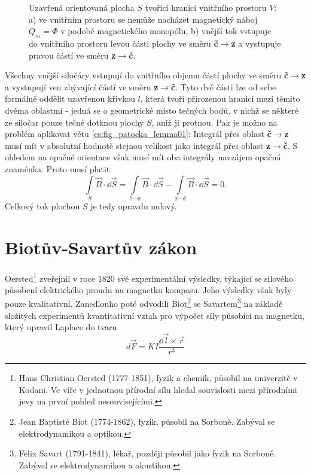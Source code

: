     \begin{figure}[ht!]
      \centering  
      \caption{Uzavřená orientovaná plocha \(S\) tvořící hranici vnitřního prostoru \(V\): a)   
               ve vnitřním prostoru se nemůže nacházet magnetický náboj \(Q_m = \Phi\) v podobě 
               magnetického monopólu, b) vnější tok vstupuje do vnitřního prostoru levou části 
               plochy ve směru \textbf{č\(\rightarrow\)z} a vystupuje pravou částí ve směru 
               \textbf{z\(\rightarrow\)č}.} 
      \label{ES:fig_patocka_mag_tok_exp16}
    \end{figure}

    Všechny vnější siločáry vstupují do vnitřního objemu částí plochy ve směru 
    \textbf{č}\(\rightarrow\)\textbf{z} a vystupují ven zbývající částí ve směru 
    \textbf{z}\(\rightarrow\)\textbf{č}. Tyto dvě části lze od sebe formálně oddělit uzavřenou 
    křivkou \(l\), která tvoří přirozenou hranici mezi těmito dvěma oblastmi - jedná se o 
    geometrické místo tečných bodů, v nichž se některé ze siločar pouze tečné dotknou plochy \(S\), 
    aniž ji protnou. Pak je možno na problém aplikovat větu \ref{es:fig_patocka_lemma01}: Integrál 
    přes oblast \textbf{č}\(\rightarrow\)\textbf{z} musí mít v absolutní hodnotě stejnou 
    velikost jako integrál přes oblast \textbf{z}\(\rightarrow\)\textbf{č}. S ohledem na opačné 
    orientace však musí mít oba integrály navzájem opačná znaménka. Proto musí platit:
    \begin{equation*}
      \int\limits_{S}\vec{B}\cdot \dd{\vec{S}} = 
      \int\limits_{\text{č}\rightarrow\text{z}}\vec{B}\cdot \dd{\vec{S}} -
      \int\limits_{\text{z}\rightarrow\text{č}}\vec{B}\cdot \dd{\vec{S}} = 0.
    \end{equation*} 
    Celkový tok plochou \(S\) je tedy opravdu nulový.
    
  \section{Biotův-Savartův zákon}\label{ES:sec10}
    Oersted\footnote{Hans Christian Oersted (1777-1851), fyzik a chemik, působil na univerzitě v 
    Kodani. Ve víře v jednotnou přírodní sílu hledal souvislosti mezi přírodními jevy na první 
    pohled nesouvisejícími.} zveřejnil v roce 1820 své experimentální výsledky, týkající se 
    silového působení elektrického proudu na magnetku kompasu. Jeho výsledky však byly pouze 
    kvalitativní. Zanedlouho poté odvodili Biot\footnote{Jean Baptisté Biot (1774-1862), fyzik, 
    působil na Sorboně. Zabýval se elektrodynamikou a optikou.} se Savartem\footnote{Felix Savart 
    (1791-1841), lékař, později působil jako fyzik na Sorboně. Zabýval se elektrodynamikou a 
    akustikou.} na základě složitých experimentů kvantitativní vztah pro výpočet síly působící na 
    magnetku, který upravil Laplace do tvaru
    \begin{equation}\label{TEO:eq133}
      d\vec{F} = KI\frac{\dd{\vec{l}}\times \vec{r}}{r^3}
    \end{equation} 
    
